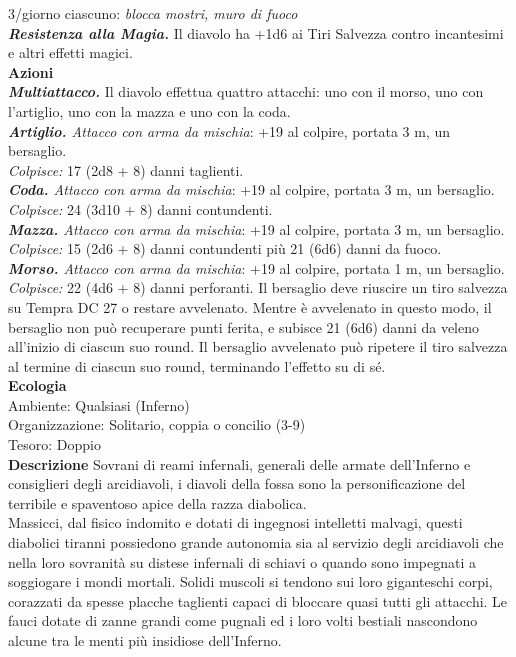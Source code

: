 \begin{multicols}{2}
3/giorno ciascuno: \emph{blocca mostri, muro di fuoco}\\
\emph{\textbf{Resistenza alla Magia.}} Il diavolo ha +1d6 ai Tiri Salvezza contro incantesimi e altri effetti magici.\\
\smallskip\textbf{Azioni}\\
\emph{\textbf{Multiattacco.}} Il diavolo effettua quattro attacchi: uno con il morso, uno con l'artiglio, uno con la mazza e uno con la coda.\\
\emph{\textbf{Artiglio.} Attacco con arma da mischia}: +19 al colpire, portata 3 m, un bersaglio.\\
\emph{Colpisce:} 17 (2d8 + 8) danni taglienti.\\
\emph{\textbf{Coda.} Attacco con arma da mischia}: +19 al colpire, portata 3 m, un bersaglio.\\
\emph{Colpisce:} 24 (3d10 + 8) danni contundenti.\\
\emph{\textbf{Mazza.} Attacco con arma da mischia}: +19 al colpire, portata 3 m, un bersaglio.\\
\emph{Colpisce:} 15 (2d6 + 8) danni contundenti più 21 (6d6) danni da fuoco.\\
\emph{\textbf{Morso.} Attacco con arma da mischia}: +19 al colpire, portata 1 m, un bersaglio.\\
\emph{Colpisce:} 22 (4d6 + 8) danni perforanti. Il bersaglio deve riuscire un tiro salvezza su Tempra DC  27 o restare avvelenato. Mentre è avvelenato in questo modo, il bersaglio non può recuperare punti ferita, e subisce 21 (6d6) danni da veleno all'inizio di ciascun suo round. Il bersaglio avvelenato può ripetere il tiro salvezza al termine di ciascun suo round, terminando l'effetto su di sé. \\
\textbf{Ecologia}\\
Ambiente: Qualsiasi (Inferno)\\
Organizzazione: Solitario, coppia o concilio (3-9)\\
Tesoro: Doppio\\
\textbf{Descrizione}
Sovrani di reami infernali, generali delle armate dell'Inferno e consiglieri degli arcidiavoli, i diavoli della fossa sono la personificazione del terribile e spaventoso apice della razza diabolica.\\
Massicci, dal fisico indomito e dotati di ingegnosi intelletti malvagi, questi diabolici tiranni possiedono grande autonomia sia al servizio degli arcidiavoli che nella loro sovranità su distese infernali di schiavi o quando sono impegnati a soggiogare i mondi mortali. Solidi muscoli si tendono sui loro giganteschi corpi, corazzati da spesse placche taglienti capaci di bloccare quasi tutti gli attacchi. Le fauci dotate di zanne grandi come pugnali ed i loro volti bestiali nascondono alcune tra le menti più insidiose dell'Inferno.\\

\end{multicols}
